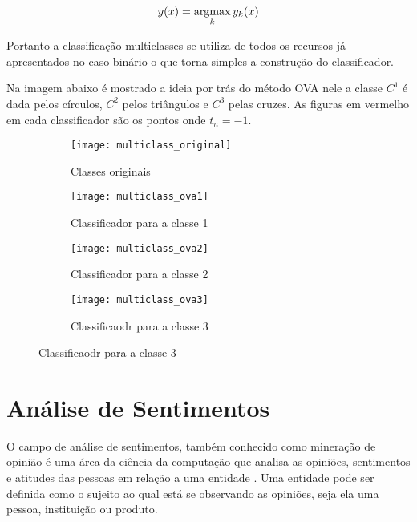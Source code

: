\begin{center}
	\begin{equation}
		y(x) = \operatorname*{argmax}_{k} y_k(x)
	\end{equation}
\end{center}

Portanto a classificação multiclasses se utiliza de todos os recursos já apresentados no caso
binário o que torna simples a construção do classificador.

Na imagem abaixo é mostrado a ideia por trás do método OVA nele a classe $C^1$ é dada pelos círculos,
$C^2$ pelos triângulos e $C^3$ pelas cruzes.
As figuras em vermelho em cada classificador são os pontos onde $t_n = -1$.

\begin{figure}[ht] 
  \begin{subfigure}[b]{0.5\linewidth}
    \centering
    \texttt{[image: multiclass\_original]} 
    \caption{Classes originais} 
    \vspace{4ex}
  \end{subfigure}%
  \begin{subfigure}[b]{0.5\linewidth}
    \centering
    \texttt{[image: multiclass\_ova1]} 
    \caption{Classificador para a classe 1} 
    \vspace{4ex}
  \end{subfigure} 
  \begin{subfigure}[b]{0.5\linewidth}
    \centering
    \texttt{[image: multiclass\_ova2]} 
    \caption{Classificador para a classe 2} 
  \end{subfigure}%
  \begin{subfigure}[b]{0.5\linewidth}
    \centering
    \texttt{[image: multiclass\_ova3]} 
    \caption{Classificaodr para a classe 3} 
  \end{subfigure} 

\end{figure}

\section{Análise de Sentimentos}

O campo de análise de sentimentos, também conhecido como mineração de opinião é uma área da
ciência da computação que analisa as opiniões, sentimentos e atitudes das pessoas em relação
a uma entidade \citep{bingliu2012}. Uma entidade pode ser definida como o sujeito ao qual está
se observando as opiniões, seja ela uma pessoa, instituição ou produto.

